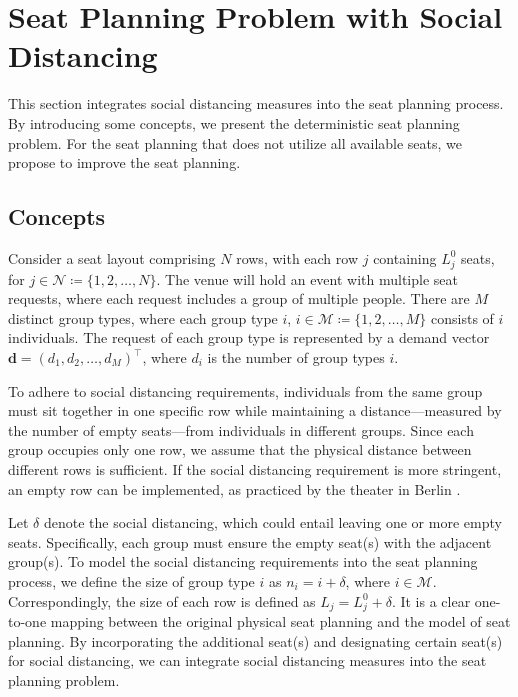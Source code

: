 \section{Seat Planning Problem with Social Distancing}\label{problem_description}
This section integrates social distancing measures into the seat planning process. By introducing some concepts, we present the deterministic seat planning problem. For the seat planning that does not utilize all available seats, we propose to improve the seat planning.

\subsection{Concepts}
Consider a seat layout comprising $N$ rows, with each row $j$ containing $L_j^0$ seats, for $j \in \mathcal{N} \coloneqq \{1,2, \ldots, N\}$. The venue will hold an event with multiple seat requests, where each request includes a group of multiple people. There are $M$ distinct group types, where each group type $i$, $i \in \mathcal{M} \coloneqq \{1, 2, \ldots, M\}$ consists of $i$ individuals. The request of each group type is represented by a demand vector $\mathbf{d} = (d_1, d_2, \ldots, d_M)^{\intercal}$, where $d_i$ is the number of group types $i$.

To adhere to social distancing requirements, individuals from the same group must sit together in one specific row while maintaining a distance—measured by the number of empty seats—from individuals in different groups. Since each group occupies only one row, we assume that the physical distance between different rows is sufficient. If the social distancing requirement is more stringent, an empty row can be implemented, as practiced by the theater in Berlin \cite{Berlin_theater}.

Let $\delta$ denote the social distancing, which could entail leaving one or more empty seats. Specifically, each group must ensure the empty seat(s) with the adjacent group(s). To model the social distancing requirements into the seat planning process, we define the size of group type $i$ as $n_i = i + \delta$, where $i \in \mathcal{M}$. Correspondingly, the size of each row is defined as $L_j = L_j^{0} + \delta$. It is a clear one-to-one mapping between the original physical seat planning and the model of seat planning. By incorporating the additional seat(s) and designating certain seat(s) for social distancing, we can integrate social distancing measures into the seat planning problem.

